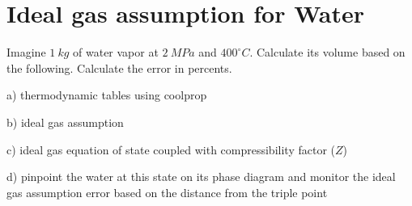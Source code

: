 \documentclass[letterpaper,10pt,english]{jupyterBook}
\begin{document}
\section{Ideal gas assumption for Water}
\label{\detokenize{notebooks/Chapter3/CH3-Q6_v1:ideal-gas-assumption-for-water}}\label{\detokenize{notebooks/Chapter3/CH3-Q6_v1::doc}}
\sphinxAtStartPar
Imagine \(1\:kg\) of water vapor at \(2\:MPa\) and \(400 ^{\circ}  C\). Calculate its volume based on the following. Calculate the error in percents.

\sphinxAtStartPar
a) thermodynamic tables using coolprop

\sphinxAtStartPar
b) ideal gas assumption

\sphinxAtStartPar
c) ideal gas equation of state coupled with compressibility factor (\(Z\))

\sphinxAtStartPar
d) pinpoint the water at this state on its phase diagram and monitor the ideal gas assumption error based on the distance from the triple point
\end{document}
